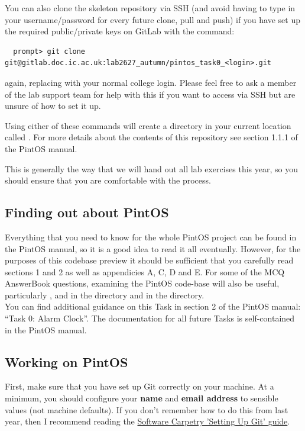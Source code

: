 \documentclass[a4paper,11pt]{article}
\begin{document}
You can also clone the skeleton repository via SSH (and avoid having to type in your username/password for every future clone, pull and push) if you have set up the required public/private keys on GitLab with the command:
%
\begin{verbatim}
  prompt> git clone git@gitlab.doc.ic.ac.uk:lab2627_autumn/pintos_task0_<login>.git
\end{verbatim}
%
again, replacing  with your normal college login.
Please feel free to ask a member of the lab support team for help with this if you want to access  via SSH but are unsure of how to set it up.

Using either of these commands will create a directory in your current location called .
For more details about the contents of this repository see section 1.1.1 of the PintOS manual.

This is generally the way that we will hand out all lab exercises this year, so you should ensure that you are comfortable with the process.


\subsection*{Finding out about PintOS}
Everything that you need to know for the whole PintOS project can be found in the PintOS manual,
so it is a good idea to read it all eventually.
However, for the purposes of this codebase preview it should be sufficient that you carefully read sections 1 and 2 
as well as appendicies A, C, D and E. 
For some of the MCQ AnswerBook questions, examining the PintOS code-base will also be useful,
particularly ,  and  in the  directory
and  in the  directory.\\

\noindent You can find additional guidance on this Task in section 2 of the PintOS manual: ``Task 0: Alarm Clock''.
The documentation for all future Tasks is self-contained in the PintOS manual.


\subsection*{Working on PintOS}
First, make sure that you have set up Git correctly on your machine.
At a minimum, you should configure your \textbf{name} and \textbf{email address} to sensible values (not machine defaults). If you don't remember how to do this from last year, then I recommend reading the \href{https://swcarpentry.github.io/git-novice/02-setup.html}{Software Carpetry 'Setting Up Git' guide}.
\end{document}
